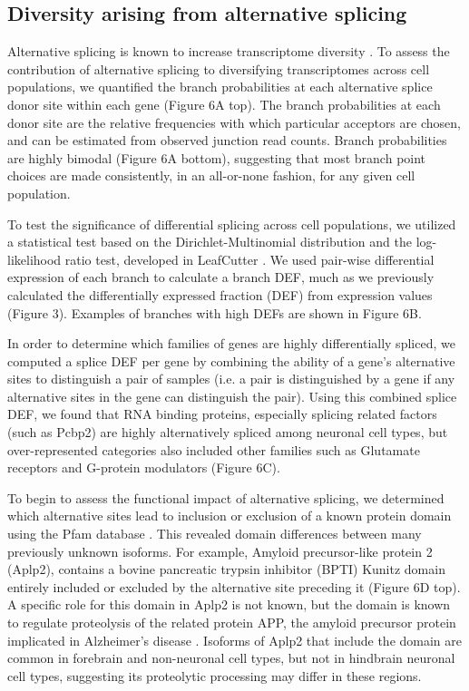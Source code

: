 \subsection{Diversity arising from alternative splicing}

Alternative splicing is known to increase transcriptome diversity \citep{ Andreadis_1987}. To assess the contribution of alternative splicing to diversifying transcriptomes across cell populations, we quantified the branch probabilities at each alternative splice donor site within each gene (Figure 6A top). The branch probabilities at each donor site are the relative frequencies with which particular acceptors are chosen, and can be estimated from observed junction read counts. Branch probabilities are highly bimodal (Figure 6A bottom), suggesting that most branch point choices are made consistently, in an all-or-none fashion, for any given cell population.

To test the significance of differential splicing across cell populations, we utilized a statistical test based on the Dirichlet-Multinomial distribution and the log-likelihood ratio test, developed in LeafCutter \citep{Li_2016}. We used pair-wise differential expression of each branch to calculate a branch DEF, much as we previously calculated the differentially expressed fraction (DEF) from expression values (Figure 3). Examples of branches with high DEFs are shown in Figure 6B. 

In order to determine which families of genes are highly differentially spliced, we computed a splice DEF per gene by combining the ability of a gene’s alternative sites to distinguish a pair of samples (i.e. a pair is distinguished by a gene if any alternative sites in the gene can distinguish the pair). Using this combined splice DEF, we found that RNA binding proteins, especially splicing related factors (such as Pcbp2) are highly alternatively spliced among neuronal cell types, but over-represented categories also included other families such as Glutamate receptors and G-protein modulators (Figure 6C). 

To begin to assess the functional impact of alternative splicing, we determined which alternative sites lead to inclusion or exclusion of a known protein domain using the Pfam database \citep{Finn_2015}. This revealed domain differences between many previously unknown isoforms. For example, Amyloid precursor-like protein 2 (Aplp2), contains a bovine pancreatic trypsin inhibitor (BPTI) Kunitz domain entirely included or excluded by the alternative site preceding it (Figure 6D top). A specific role for this domain in Aplp2 is not known, but the domain is known to regulate proteolysis of the related protein APP, the amyloid precursor protein implicated in Alzheimer's disease \citep{Beckmann_2016}. Isoforms of Aplp2 that include the domain are common in forebrain and non-neuronal cell types, but not in hindbrain neuronal cell types, suggesting its proteolytic processing may differ in these regions.

